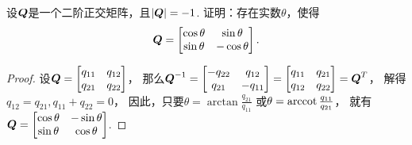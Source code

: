 \begin{example}
设\(\boldsymbol{Q}\)是一个二阶正交矩阵，且\(\abs{\boldsymbol{Q}} = -1\).
证明：存在实数\(\theta\)，使得\begin{equation*}
	\boldsymbol{Q} = \begin{bmatrix}
		\cos\theta & \sin\theta \\
		\sin\theta & -\cos\theta
	\end{bmatrix}.
\end{equation*}
\begin{proof}
设\(
	\boldsymbol{Q} = \begin{bmatrix}
		q_{11} & q_{12} \\
		q_{21} & q_{22}
	\end{bmatrix}
\)，
那么\(
	\boldsymbol{Q}^{-1}
	= \begin{bmatrix}
		-q_{22} & q_{12} \\
		q_{21} & -q_{11}
	\end{bmatrix}
	= \begin{bmatrix}
		q_{11} & q_{21} \\
		q_{12} & q_{22}
	\end{bmatrix}
	= \boldsymbol{Q}^T
\)，
解得\(
	q_{12} = q_{21},
	\allowbreak
	q_{11} + q_{22} = 0
\)，
因此，只要\(\theta = \arctan\frac{q_{21}}{q_{11}}\)
或\(\theta = \arccot\frac{q_{11}}{q_{21}}\)，
就有\(
	\boldsymbol{Q} = \begin{bmatrix}
		\cos\theta & -\sin\theta \\
		\sin\theta & \cos\theta
	\end{bmatrix}
\).
\end{proof}
\end{example}

